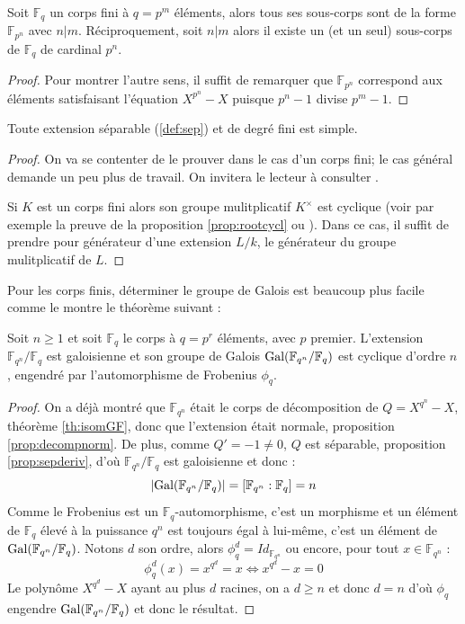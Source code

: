 \documentclass[a4paper]{article} %
\numberwithin{section}{part}
\numberwithin{equation}{section}
\newcommand\GF[1]{\mathbb{F}_{#1}}
\begin{document}
\begin{prop}
Soit $\GF{q}$ un corps fini à $q = p^m$ éléments, alors tous ses sous-corps sont
de la forme $\GF{p^n}$ avec $n|m$. Réciproquement, soit $n|m$ alors il existe un
(et un seul) sous-corps de $\GF{q}$ de cardinal $p^n$.
\end{prop}
\begin{proof}
Pour montrer l'autre sens, il suffit de remarquer que $\GF{p^n}$ correspond aux
éléments satisfaisant l'équation $X^{p^n} - X$ puisque $p^n - 1$ divise $p^m -
1$.
\end{proof}

\begin{thm}
\label{th:elemprim}
Toute extension séparable (\ref{def:sep}) et de degré fini est simple.
\end{thm}
\begin{proof}
On va se contenter de le prouver dans le cas d'un corps fini; le cas général
demande un peu plus de travail. On invitera le lecteur à consulter
\cite[p.~87]{Esc}.\par
Si $K$ est un corps fini alors son groupe mulitplicatif $K^{\times}$ est
cyclique (voir par exemple la preuve de la proposition \ref{prop:rootcycl} ou
\cite[p.~50]{LiNi1}). Dans ce cas, il suffit de prendre pour générateur d'une
extension $L/k$, le générateur du groupe mulitplicatif de $L$.
\end{proof}

Pour les corps finis, déterminer le groupe de Galois est beaucoup plus facile
comme le montre le théorème suivant :

\begin{thm}
Soit $n\geq1$ et soit $\GF{q}$ le corps à $q=p^r$ éléments, avec $p$ premier.
L'extension $\GF{q^n}/\GF{q}$ est galoisienne et son groupe de Galois
$\textup{Gal}(\GF{q^n}/\GF{q})$ est cyclique d'ordre $n$, engendré par 
l'automorphisme de Frobenius $\phi_q$.
\end{thm}
\begin{proof}
On a déjà montré que $\GF{q^n}$ était le corps de décomposition de $Q = X^{q^n} 
- X$, théorème \ref{th:isomGF}, donc que l'extension était normale, proposition 
\ref{prop:decompnorm}. De plus, comme $Q' = -1 \neq 0$, $Q$ est séparable,
proposition \ref{prop:sepderiv}, d'où $\GF{q^n}/\GF{q}$ est galoisienne
et donc :
\[|\textup{Gal}(\GF{q^n}/\GF{q})| = [\GF{q^n}:\GF{q}] = n\]
Comme le Frobenius est un $\GF{q}$-automorphisme, c'est un morphisme et un 
élément de $\GF{q}$ élevé à la puissance $q^n$ est toujours égal à lui-même, 
c'est un élément de $\textup{Gal}(\GF{q^n}/\GF{q})$. Notons $d$ son ordre, alors
$\phi_q^d = Id_{\GF{q^n}}$ ou encore, pour tout $x\in\GF{q^n}$ :
\[\phi_q^d(x) = x^{q^d} = x \Leftrightarrow x^{q^d} - x = 0\]
Le polynôme $X^{q^d} - X$ ayant au plus $d$ racines, on a $d\geq n$ et donc $d =
n$ d'où $\phi_q$ engendre $\textup{Gal}(\GF{q^n}/\GF{q})$ et donc le
résultat.
\end{proof}
\end{document}
